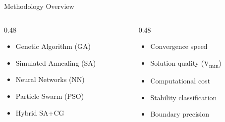 \begin{frame}{Methodology Overview}
\begin{columns}
\begin{column}{0.48\textwidth}
\begin{tcolorbox}[
    enhanced,
    colback=black!85,
    colframe=mypurple,
    arc=3mm,
    boxrule=1pt,
    title={\color{Yellow!80!white}Algorithms to Compare}
]
\begin{itemize}
    \item Genetic Algorithm (GA)
    \item Simulated Annealing (SA)
    \item Neural Networks (NN)
    \item Particle Swarm (PSO)
    \item Hybrid SA+CG
\end{itemize}
\end{tcolorbox}
\end{column}

\begin{column}{0.48\textwidth}
\begin{tcolorbox}[
    enhanced,
    colback=black!85,
    colframe=mypurple,
    arc=3mm,
    boxrule=1pt,
    title={\color{Yellow!80!white}Evaluation Metrics}
]
\begin{itemize}
    \item Convergence speed
    \item Solution quality (V\textsubscript{min})
    \item Computational cost
    \item Stability classification
    \item Boundary precision
\end{itemize}
\end{tcolorbox}
\end{column}
\end{columns}

\vspace{0.5cm}

\end{frame}

